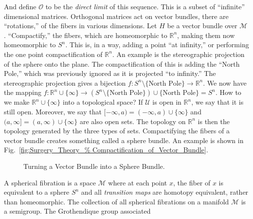         And define $\mathcal{O}$ to be the
        \textit{direct limit} of this sequence.
        This is a subset of ``infinite'' dimensional
        matrices. Orthogonal matrices act on vector bundles,
        there are ``rotations,'' of the fibers in
        various dimensions. Let $H$ be a vector bundle over
        $\mathcal{M}$. ``Compactify,'' the fibers,
        which are homeomorphic to $\mathbb{R}^{n}$, making
        them now homeomorphic to $S^{n}$. This is, in a way,
        adding a point ``at infinity,'' or performing the
        one point compactification of $\mathbb{R}^{n}$.
        An example is the stereographic projection of the
        sphere onto the plane. The compactification of
        this is adding the ``North Pole,'' which was
        previously ignored as it is projected
        ``to infinity.'' The stereographic projection
        gives a bijection
        $f:S^{n}\setminus\{\textrm{North Pole}\}%
         \rightarrow\mathbb{R}^{n}$.
        We now have the mapping
        $f:\mathbb{R}^{n}\cup\{\infty\}%
         \rightarrow(S^{n}\setminus\{\textrm{North Pole}\})%
         \cup\{\textrm{North Pole}\}=S^{n}$.
        How to we make $\mathbb{R}^{n}\cup\{\infty\}$ into
        a topological space? If
        $\mathcal{U}$ is open in $\mathbb{R}^{n}$, we say
        that it is still open. Moreover, we say that
        $[-\infty,a)=(-\infty,a)\cup\{\infty\}$ and
        $(a,\infty]=(a,\infty)\cup\{\infty\}$ are also
        open sets. The topology on $\mathbb{R}^{n}$ is
        then the topology generated by the three types
        of sets. Compactifying the fibers of a vector bundle
        creates something called a sphere bundle. An
        example is shown in
        Fig.~\ref{fig:Surgery_Theory_%
                  Compactification_of_Vector_Bundle}.
        \begin{figure}
            \centering
            \captionsetup{type=figure}
            
            \caption{Turning a Vector Bundle into a Sphere Bundle.}
            \label{fig:Surgery_Theory_%
                   Compactification_of_Vector_Bundle}
        \end{figure}
        A spherical fibration is a space $\mathcal{M}$
        where at each point $x$, the fiber of $x$ is
        equivalent to a sphere $S^{n}$ and all
        \textit{transition maps} are homotopy equivalent,
        rather than homeomorphic. The collection of all
        spherical fibrations on a manifold $\mathcal{M}$
        is a semigroup. The Grothendique group associated
